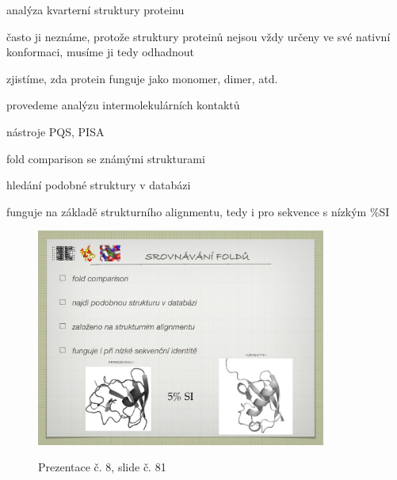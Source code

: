 \documentclass[DIV=8]{scrreprt}
\begin{document}
\begin{myItemize}[nosep]
    \item analýza kvarterní struktury proteinu
\begin{myItemize}[nosep]
    \item často ji neznáme, protože struktury proteinů nejsou vždy určeny ve své nativní konformaci, musíme ji tedy odhadnout
    \item zjistíme, zda protein funguje jako monomer, dimer, atd.
    \item provedeme analýzu intermolekulárních kontaktů
    \item nástroje PQS, PISA
\end{myItemize}

    \item fold comparison se známými strukturami
\begin{myItemize}[nosep]
    \item hledání podobné struktury v databázi
    \item funguje na základě strukturního alignmentu, tedy i pro sekvence s nízkým \%SI \begin{figure}
    \caption{Prezentace č. 8, slide č. 81}
    \includegraphics[width=0.85\textwidth]{slides-8/slide-81.jpg}
    \centering
    \label{slides-8-slide-81}
\end{figure}


\end{myItemize}
\end{myItemize}
\end{document}
